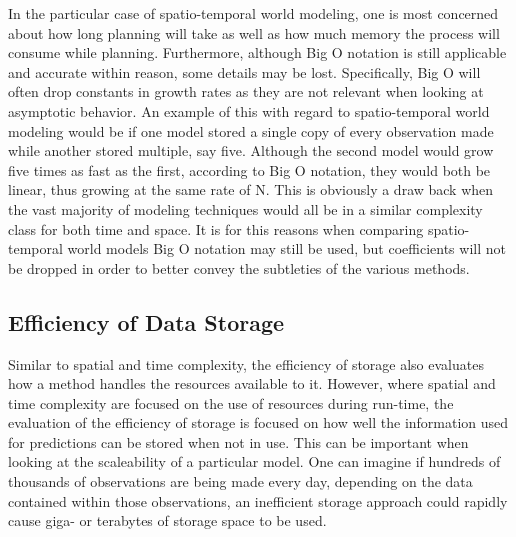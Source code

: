   In the particular case of spatio-temporal world modeling, one is most
  concerned about how long planning will take as well as how much memory the
  process will consume while planning. Furthermore, although Big O notation is
  still applicable and accurate within reason, some details may be lost.
  Specifically, Big O will often drop constants in growth rates as they are
  not relevant when looking at asymptotic behavior. An example of this with
  regard to spatio-temporal world modeling would be if one model stored a
  single copy of every observation made while another stored multiple, say
  five. Although the second model would grow five times as fast as the first,
  according to Big O notation, they would both be linear, thus growing at the
  same rate of N. This is obviously a draw back when the vast majority of
  modeling techniques would all be in a similar complexity class for both time
  and space. It is for this reasons when comparing spatio-temporal world
  models Big O notation may still be used, but coefficients will not be
  dropped in order to better convey the subtleties of the various methods.


  \subsection{ Efficiency of Data Storage }
  Similar to spatial and time complexity, the efficiency of storage also
  evaluates how a method handles the resources available to it. However, where
  spatial and time complexity are focused on the use of resources during
  run-time, the evaluation of the efficiency of storage is focused on how well
  the information used for predictions can be stored when not in use. This
  can be important when looking at the scaleability of a particular model. One
  can imagine if hundreds of thousands of observations are being made every
  day, depending on the data contained within those observations, an
  inefficient storage approach could rapidly cause giga- or terabytes of storage
  space to be used.

